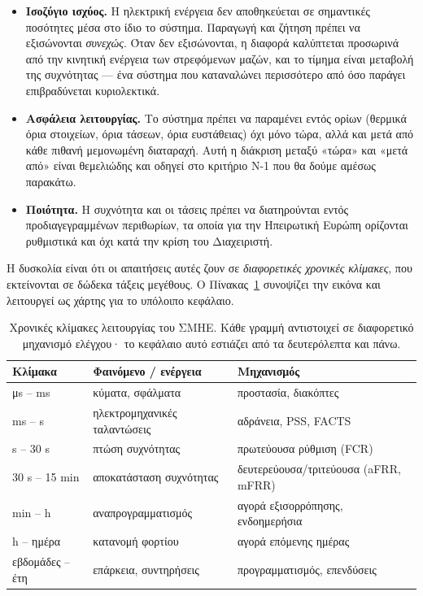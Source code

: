 \begin{itemize}
\item \textbf{Ισοζύγιο ισχύος.} Η ηλεκτρική ενέργεια δεν αποθηκεύεται σε σημαντικές
      ποσότητες μέσα στο ίδιο το σύστημα. Παραγωγή και ζήτηση πρέπει να εξισώνονται
      \emph{συνεχώς}. Όταν δεν εξισώνονται, η διαφορά καλύπτεται προσωρινά από την
      κινητική ενέργεια των στρεφόμενων μαζών, και το τίμημα είναι μεταβολή της
      συχνότητας — ένα σύστημα που καταναλώνει περισσότερο από όσο παράγει επιβραδύνεται
      κυριολεκτικά.
\item \textbf{Ασφάλεια λειτουργίας.} Το σύστημα πρέπει να παραμένει εντός ορίων (θερμικά
      όρια στοιχείων, όρια τάσεων, όρια ευστάθειας) όχι μόνο τώρα, αλλά και μετά από κάθε
      πιθανή μεμονωμένη διαταραχή. Αυτή η διάκριση μεταξύ «τώρα» και «μετά από» είναι
      θεμελιώδης και οδηγεί στο κριτήριο N-1 που θα δούμε αμέσως παρακάτω.
\item \textbf{Ποιότητα.} Η συχνότητα και οι τάσεις πρέπει να διατηρούνται εντός
      προδιαγεγραμμένων περιθωρίων, τα οποία για την Ηπειρωτική Ευρώπη ορίζονται
      ρυθμιστικά και όχι κατά την κρίση του Διαχειριστή.
\end{itemize}

Η δυσκολία είναι ότι οι απαιτήσεις αυτές ζουν σε \emph{διαφορετικές χρονικές κλίμακες},
που εκτείνονται σε δώδεκα τάξεις μεγέθους. Ο Πίνακας~\ref{tab:chronikes-klimakes}
συνοψίζει την εικόνα και λειτουργεί ως χάρτης για το υπόλοιπο κεφάλαιο.

\begin{table}[!htbp]
\centering
\begin{tabular}{lll}
\hline
Κλίμακα & Φαινόμενο / ενέργεια & Μηχανισμός \\
\hline
μs -- ms   & κύματα, σφάλματα           & προστασία, διακόπτες \\
ms -- s    & ηλεκτρομηχανικές ταλαντώσεις & αδράνεια, PSS, FACTS \\
s -- 30 s  & πτώση συχνότητας            & πρωτεύουσα ρύθμιση (FCR) \\
30 s -- 15 min & αποκατάσταση συχνότητας & δευτερεύουσα/τριτεύουσα (aFRR, mFRR) \\
min -- h   & αναπρογραμματισμός          & αγορά εξισορρόπησης, ενδοημερήσια \\
h -- ημέρα & κατανομή φορτίου            & αγορά επόμενης ημέρας \\
εβδομάδες -- έτη & επάρκεια, συντηρήσεις & προγραμματισμός, επενδύσεις \\
\hline
\end{tabular}
\caption{Χρονικές κλίμακες λειτουργίας του ΣΜΗΕ. Κάθε γραμμή αντιστοιχεί σε διαφορετικό
μηχανισμό ελέγχου· το κεφάλαιο αυτό εστιάζει από τα δευτερόλεπτα και πάνω.}
\label{tab:chronikes-klimakes}
\end{table}

